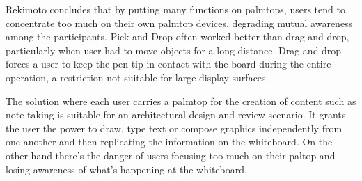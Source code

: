 Rekimoto concludes that by putting many functions on palmtops,
users tend to concentrate too much on their own palmtop devices,
degrading mutual awareness among the participants.
Pick-and-Drop often worked better than drag-and-drop,
particularly when user had to move objects for a long distance.
Drag-and-drop forces a user to keep the pen tip in contact
with the board during the entire operation,
a restriction not suitable for large display surfaces.


The solution where each user carries a palmtop for the creation of content such as note taking
is suitable for an architectural design and review scenario.
It grants the user the power to draw, type text or compose graphics 
independently from one another and then replicating the information on the whiteboard.
On the other hand there's the danger of users focusing too much on their paltop and losing
awareness of what's happening at the whiteboard.
